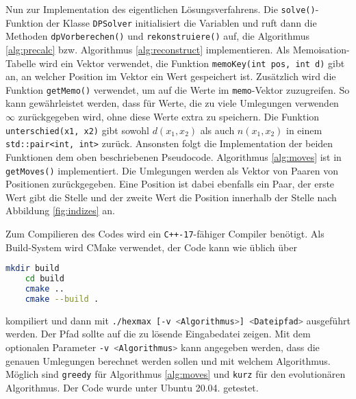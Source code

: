 \documentclass[a4paper,10pt,ngerman]{scrartcl}
\begin{document}
Nun zur Implementation des eigentlichen Lösungsverfahrens. 
Die \lstinline{solve()}-Funktion  der Klasse \lstinline{DPSolver} initialisiert die Variablen und ruft dann die Methoden \lstinline{dpVorberechen()} und \lstinline{rekonstruiere()}  auf, die Algorithmus \ref{alg:precalc} bzw. Algorithmus \ref{alg:reconstruct} implementieren.
Als Memoisation-Tabelle wird ein Vektor verwendet, die Funktion \lstinline{memoKey(int pos, int d)} gibt an, an welcher Position im Vektor ein Wert gespeichert ist. 
Zusätzlich wird die Funktion \lstinline{getMemo()} verwendet, um auf die Werte im \lstinline{memo}-Vektor zuzugreifen. 
So kann gewährleistet werden, dass für Werte, die zu viele Umlegungen verwenden $\infty$ zurückgegeben wird, ohne diese Werte extra zu speichern. 
Die Funktion \lstinline{unterschied(x1, x2)} gibt sowohl $d(x_1, x_2)$ als auch $n(x_1, x_2)$ in einem \lstinline{std::pair<int, int>} zurück. 
Ansonsten folgt die Implementation der beiden Funktionen dem oben beschriebenen Pseudocode. 
Algorithmus \ref{alg:moves} ist in \lstinline{getMoves()} implementiert. 
Die Umlegungen werden als Vektor von Paaren von Positionen zurückgegeben.
Eine Position ist dabei ebenfalls ein Paar, der erste Wert gibt die Stelle und der zweite Wert die Position innerhalb der Stelle nach Abbildung \ref{fig:indizes} an.

Zum Compilieren des Codes wird ein \texttt{C++-17}-fähiger Compiler benötigt.
Als Build-System wird CMake verwendet, der Code kann wie üblich über 
\begin{lstlisting}[language=bash]
    mkdir build
    cd build
    cmake ..
    cmake --build . 
\end{lstlisting}    
kompiliert und dann mit \lstinline[language=bash]{./hexmax [-v <Algorithmus>] <Dateipfad>} ausgeführt werden. Der Pfad sollte auf die zu lösende Eingabedatei zeigen. Mit dem optionalen Parameter \lstinline[language=bash]{-v <Algorithmus>} kann angegeben werden, dass die genauen Umlegungen berechnet werden sollen und mit welchem Algorithmus. Möglich sind \lstinline[language=bash]{greedy} für Algorithmus \ref{alg:moves} und \lstinline[language=bash]{kurz} für den evolutionären Algorithmus. Der Code wurde unter Ubuntu 20.04. getestet. 
\end{document}
